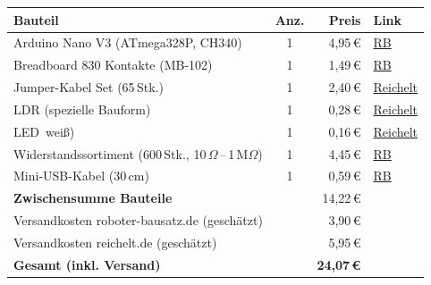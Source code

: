 \documentclass[a4paper,12pt]{article}
\begin{document}
\begin{table}[h!]
\centering
\renewcommand{\arraystretch}{1.35}
\begin{tabular}{@{} l c r l @{}}
\toprule
\textbf{Bauteil} & \textbf{Anz.} & \textbf{Preis} & \textbf{Link} \\
\midrule

Arduino Nano V3 (ATmega328P, CH340)
  & 1 & 4,95\,\euro{}
  & \href{https://www.roboter-bausatz.de/p/nano-mega328p-v3.0-usb-ch340-modul}{RB} \\

Breadboard 830 Kontakte (MB-102)
  & 1 & 1,49\,\euro{}
  & \href{https://www.roboter-bausatz.de/p/mb102-breadboard-830-kontakte}{RB} \\

Jumper-Kabel Set (65\,Stk.)
  & 1 & 2,40\,\euro{}
  & \href{https://www.reichelt.de/de/de/shop/produkt/entwicklerboards_-_kabel-set_verschiedene_laengen_65er-pack_-282690}{Reichelt} \\

LDR (spezielle Bauform)
  & 1 & 0,28\,\euro{}
  & \href{https://www.reichelt.de/de/de/shop/produkt/ldr_100mw_150_300kohm_560nm_150vdc_led_5mm-379958}{Reichelt} \\

LED\ weiß)
  & 1 & 0,16\,\euro{}
  & \href{https://www.reichelt.de/de/de/shop/produkt/led_5mm_bedrahtet_weiss_20000_mcd_15_-361626}{Reichelt} \\

Widerstandssortiment (600\,Stk., 10\,$\Omega$\,--\,1\,M$\Omega$)
  & 1 & 4,45\,\euro{}
  & \href{https://www.roboter-bausatz.de/p/600-metallschicht-widerstaende-30-werte-zu-je-20-stueck-10-1m-ohm}{RB} \\

Mini-USB-Kabel (30\,cm)
  & 1 & 0,59\,\euro{}
  & \href{https://www.roboter-bausatz.de/p/mini-usb-kabel-30-cm-usb-a-stecker-auf-mini-b-stecker}{RB} \\

\midrule
\multicolumn{2}{l}{\textbf{Zwischensumme Bauteile}}
  & 14,22\,\euro{} & \\
\multicolumn{2}{l}{Versandkosten roboter-bausatz.de (geschätzt)}
  & 3,90\,\euro{} & \\
\multicolumn{2}{l}{Versandkosten reichelt.de (geschätzt)}
  & 5,95\,\euro{} & \\
\midrule
\multicolumn{2}{l}{\textbf{Gesamt (inkl. Versand)}}
  & \textbf{24,07\,\euro{}} & \\
\bottomrule
\end{tabular}

\label{tab:kosten-rb}
\end{table}
\end{document}

